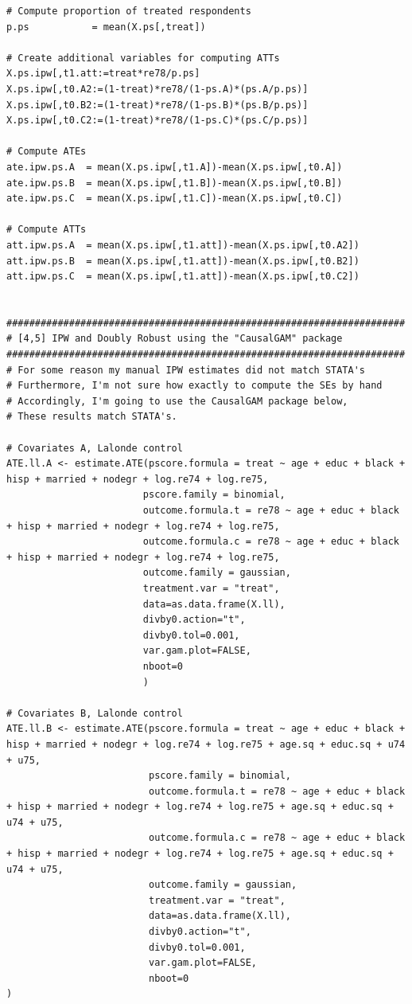 \documentclass[12pt]{article}
\begin{document}
\begin{verbatim}
# Compute proportion of treated respondents
p.ps           = mean(X.ps[,treat])

# Create additional variables for computing ATTs
X.ps.ipw[,t1.att:=treat*re78/p.ps]
X.ps.ipw[,t0.A2:=(1-treat)*re78/(1-ps.A)*(ps.A/p.ps)]
X.ps.ipw[,t0.B2:=(1-treat)*re78/(1-ps.B)*(ps.B/p.ps)]
X.ps.ipw[,t0.C2:=(1-treat)*re78/(1-ps.C)*(ps.C/p.ps)]

# Compute ATEs
ate.ipw.ps.A  = mean(X.ps.ipw[,t1.A])-mean(X.ps.ipw[,t0.A])
ate.ipw.ps.B  = mean(X.ps.ipw[,t1.B])-mean(X.ps.ipw[,t0.B])
ate.ipw.ps.C  = mean(X.ps.ipw[,t1.C])-mean(X.ps.ipw[,t0.C])

# Compute ATTs
att.ipw.ps.A  = mean(X.ps.ipw[,t1.att])-mean(X.ps.ipw[,t0.A2])
att.ipw.ps.B  = mean(X.ps.ipw[,t1.att])-mean(X.ps.ipw[,t0.B2])
att.ipw.ps.C  = mean(X.ps.ipw[,t1.att])-mean(X.ps.ipw[,t0.C2])


######################################################################
# [4,5] IPW and Doubly Robust using the "CausalGAM" package
######################################################################
# For some reason my manual IPW estimates did not match STATA's
# Furthermore, I'm not sure how exactly to compute the SEs by hand
# Accordingly, I'm going to use the CausalGAM package below,
# These results match STATA's.

# Covariates A, Lalonde control
ATE.ll.A <- estimate.ATE(pscore.formula = treat ~ age + educ + black + hisp + married + nodegr + log.re74 + log.re75,
                        pscore.family = binomial,
                        outcome.formula.t = re78 ~ age + educ + black + hisp + married + nodegr + log.re74 + log.re75,
                        outcome.formula.c = re78 ~ age + educ + black + hisp + married + nodegr + log.re74 + log.re75,
                        outcome.family = gaussian,
                        treatment.var = "treat",
                        data=as.data.frame(X.ll),
                        divby0.action="t",
                        divby0.tol=0.001,
                        var.gam.plot=FALSE,
                        nboot=0
                        ) 

# Covariates B, Lalonde control
ATE.ll.B <- estimate.ATE(pscore.formula = treat ~ age + educ + black + hisp + married + nodegr + log.re74 + log.re75 + age.sq + educ.sq + u74 + u75,
                         pscore.family = binomial,
                         outcome.formula.t = re78 ~ age + educ + black + hisp + married + nodegr + log.re74 + log.re75 + age.sq + educ.sq + u74 + u75,
                         outcome.formula.c = re78 ~ age + educ + black + hisp + married + nodegr + log.re74 + log.re75 + age.sq + educ.sq + u74 + u75,
                         outcome.family = gaussian,
                         treatment.var = "treat",
                         data=as.data.frame(X.ll),
                         divby0.action="t",
                         divby0.tol=0.001,
                         var.gam.plot=FALSE,
                         nboot=0
) 


\end{verbatim}
\end{document}
